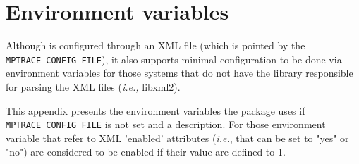 \chapter{Environment variables}\label{cha:EnvVar}

Although \TRACE is configured through an XML file (which is pointed by the {\tt MPTRACE\_CONFIG\_FILE}), it also supports minimal configuration to be done via environment variables for those systems that do not have the library responsible for parsing the XML files ({\em i.e.,} libxml2).

This appendix presents the environment variables the \TRACE package uses if {\tt MPTRACE\_CONFIG\_FILE} is not set and a description. For those environment variable that refer to XML 'enabled' attributes ({\em i.e.}, that can be set to "yes" or "no") are considered to be enabled if their value are defined to 1.
 
